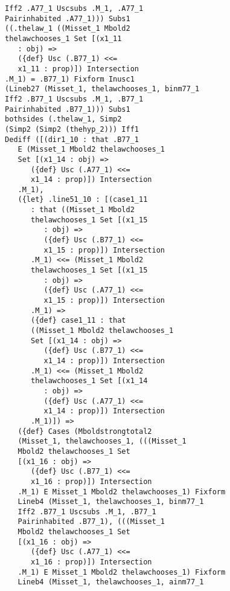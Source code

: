 \documentclass[12pt]{article}
\begin{document}
\begin{verbatim}
             Iff2 .A77_1 Uscsubs .M_1, .A77_1 
             Pairinhabited .A77_1))) Subs1 
             ((.thelaw_1 ((Misset_1 Mbold2 
             thelawchooses_1 Set [(x1_11 
                : obj) => 
                ({def} Usc (.B77_1) <<= 
                x1_11 : prop)]) Intersection 
             .M_1) = .B77_1) Fixform Inusc1 
             (Lineb27 (Misset_1, thelawchooses_1, binm77_1 
             Iff2 .B77_1 Uscsubs .M_1, .B77_1 
             Pairinhabited .B77_1))) Subs1 
             bothsides (.thelaw_1, Simp2 
             (Simp2 (Simp2 (thehyp_2))) Iff1 
             Dediff ([(dir1_10 : that .B77_1 
                E (Misset_1 Mbold2 thelawchooses_1 
                Set [(x1_14 : obj) => 
                   ({def} Usc (.A77_1) <<= 
                   x1_14 : prop)]) Intersection 
                .M_1), 
                ({let} .line51_10 : [(case1_11 
                   : that ((Misset_1 Mbold2 
                   thelawchooses_1 Set [(x1_15 
                      : obj) => 
                      ({def} Usc (.B77_1) <<= 
                      x1_15 : prop)]) Intersection 
                   .M_1) <<= (Misset_1 Mbold2 
                   thelawchooses_1 Set [(x1_15 
                      : obj) => 
                      ({def} Usc (.A77_1) <<= 
                      x1_15 : prop)]) Intersection 
                   .M_1) => 
                   ({def} case1_11 : that 
                   ((Misset_1 Mbold2 thelawchooses_1 
                   Set [(x1_14 : obj) => 
                      ({def} Usc (.B77_1) <<= 
                      x1_14 : prop)]) Intersection 
                   .M_1) <<= (Misset_1 Mbold2 
                   thelawchooses_1 Set [(x1_14 
                      : obj) => 
                      ({def} Usc (.A77_1) <<= 
                      x1_14 : prop)]) Intersection 
                   .M_1)]) => 
                ({def} Cases (Mboldstrongtotal2 
                (Misset_1, thelawchooses_1, (((Misset_1 
                Mbold2 thelawchooses_1 Set 
                [(x1_16 : obj) => 
                   ({def} Usc (.B77_1) <<= 
                   x1_16 : prop)]) Intersection 
                .M_1) E Misset_1 Mbold2 thelawchooses_1) Fixform 
                Lineb4 (Misset_1, thelawchooses_1, binm77_1 
                Iff2 .B77_1 Uscsubs .M_1, .B77_1 
                Pairinhabited .B77_1), (((Misset_1 
                Mbold2 thelawchooses_1 Set 
                [(x1_16 : obj) => 
                   ({def} Usc (.A77_1) <<= 
                   x1_16 : prop)]) Intersection 
                .M_1) E Misset_1 Mbold2 thelawchooses_1) Fixform 
                Lineb4 (Misset_1, thelawchooses_1, ainm77_1 

\end{verbatim}
\end{document}
